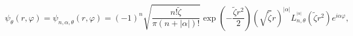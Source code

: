 \begin{equation}
\psi_{\theta}\left(  r,\varphi\right)  =\psi_{n,\alpha,\theta}\left(
r,\varphi\right)  =\left(  -1\right)  ^{n}\sqrt{\frac{n!\tilde{\zeta}}%
{\pi\left(  n+\left|  \alpha\right|  \right)  !}}\exp\left(  -\frac
{\tilde{\zeta}r^{2}}{2}\right)  \left(  \sqrt{\tilde{\zeta}}r\right)
^{\left|  \alpha\right|  }L_{n,\theta}^{^{\left|  \alpha\right|  }}\left(
\tilde{\zeta}r^{2}\right)  e^{i\alpha\varphi},\label{47}%
\end{equation}

